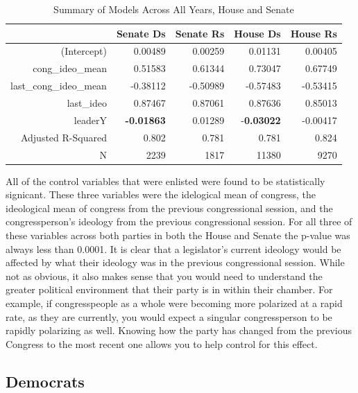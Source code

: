 \documentclass[12pt,twoside]{reedthesis}
\begin{document}
  \begin{table}[h]
  \centering
  \caption{Summary of Models Across All Years, House and Senate}
  \begin{tabular}{r|rrrr}
                         & Senate Ds & Senate Rs & House Ds & House Rs \\ \hline
  (Intercept)            & 0.00489   & 0.00259   & 0.01131  & 0.00405  \\
  cong\_ideo\_mean       & 0.51583   & 0.61344   & 0.73047  & 0.67749  \\
  last\_cong\_ideo\_mean & -0.38112  & -0.50989  & -0.57483 & -0.53415 \\
  last\_ideo             & 0.87467   & 0.87061   & 0.87636  & 0.85013  \\
  leaderY                & \textbf{-0.01863}  & 0.01289   & -\textbf{0.03022} & -0.00417 \\
  Adjusted R-Squared     & 0.802     & 0.781     & 0.781    & 0.824    \\
  N                      & 2239      & 1817      & 11380    & 9270    
  \end{tabular}
  \end{table}
  
  All of the control variables that were enlisted were found to be
  statistically signicant. These three variables were the idelogical mean
  of congress, the ideological mean of congress from the previous
  congressional session, and the congressperson's ideology from the
  previous congressional session. For all three of these variables across
  both parties in both the House and Senate the p-value was always less
  than 0.0001. It is clear that a legislator's current ideology would be
  affected by what their ideology was in the previous congressional
  session. While not as obvious, it also makes sense that you would need
  to understand the greater political environment that their party is in
  within their chamber. For example, if congresspeople as a whole were
  becoming more polarized at a rapid rate, as they are currently, you
  would expect a singular congressperson to be rapidly polarizing as well.
  Knowing how the party has changed from the previous Congress to the most
  recent one allows you to help control for this effect.
  
  \subsection{Democrats}\label{democrats}
  
\end{document}
